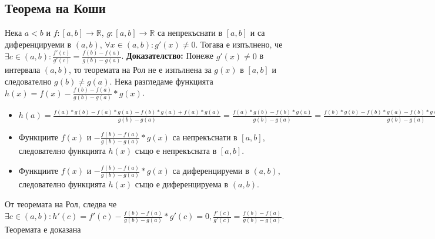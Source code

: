 \documentclass[fleqn,12pt]{article}
\begin{document}
\begin{flushleft}
\subsection{Теорема на Коши}
Нека $a<b$ и $f:[a,b]\rightarrow\mathbb{R}$, $g:[a,b]\rightarrow\mathbb{R}$ са непрекъснати в $[a,b]$ и са диференцируеми в $(a,b)$, $\forall x \in (a,b): g'(x) \neq 0$.
Тогава е изпълнено, че $\exists c \in (a,b): \frac{f'(c)}{g'(c)}=\frac{f(b)-f(a)}{g(b)-g(a)}$.
\bigbreak
\textbf{Доказателство:}
Понеже $g'(x) \neq 0$ в интервала $(a,b)$, то теоремата на Рол не е изпълнена за $g(x)$ в $[a,b]$ и следователно $g(b) \neq g(a)$.
Нека разгледаме функцията $h(x)=f(x) - \frac{f(b)-f(a)}{g(b)-g(a)}*g(x)$.
\begin{itemize}
    \item $h(a)=\frac{f(a)*g(b) - f(a)*g(a) - f(b)*g(a) + f(a)*g(a)}{g(b)-g(a)} = \frac{f(a)*g(b)-f(b)*g(a)}{g(b)-g(a)} = \frac{f(b)*g(b) - f(b)*g(a) - f(b)*g(b) + f(a)*g(b)}{g(b)-g(a)} = h(b)$
    \item Функциите $f(x)$ и $-\frac{f(b)-f(a)}{g(b)-g(a)}*g(x)$ са непрекъснати в $[a,b]$, следователно функцията $h(x)$ също е непрекъсната в $[a,b]$.
    \item Функциите $f(x)$ и $-\frac{f(b)-f(a)}{g(b)-g(a)}*g(x)$ са диференцируеми в $(a,b)$, следователно функцията $h(x)$ също е диференцируема в $(a,b)$.
\end{itemize}
От теоремата на Рол, следва че $\exists c \in (a,b): h'(c) = f'(c) - \frac{f(b)-f(a)}{g(b)-g(a)}*g'(c) = 0, \frac{f'(c)}{g'(c)} = \frac{f(b)-f(a)}{g(b)-g(a)}$.
Теоремата е доказана



\end{flushleft}
\end{document}
